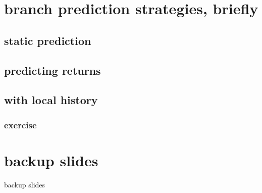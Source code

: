 \date{}
\title{}
\date{}

\begin{frame}
    \titlepage
\end{frame}



\section{branch prediction strategies, briefly}

\subsection{static prediction}


\subsection{predicting returns}


\subsection{with local history}


\subsubsection{exercise}


\section{backup slides}
\begin{frame}{backup slides}
\end{frame}


